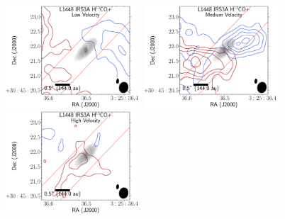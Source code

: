 \begin{figure}[H]
\begin{center} %
   \includegraphics[width=0.45\textwidth]{img/L1448IRS3B_H13COp_image_taper400k__low.pdf}
   \includegraphics[width=0.45\textwidth]{img/L1448IRS3B_H13COp_image_taper400k__medium.pdf}
   \includegraphics[width=0.45\textwidth]{img/L1448IRS3B_H13COp_image_taper400k__high.pdf}
\end{center}

\end{figure}
